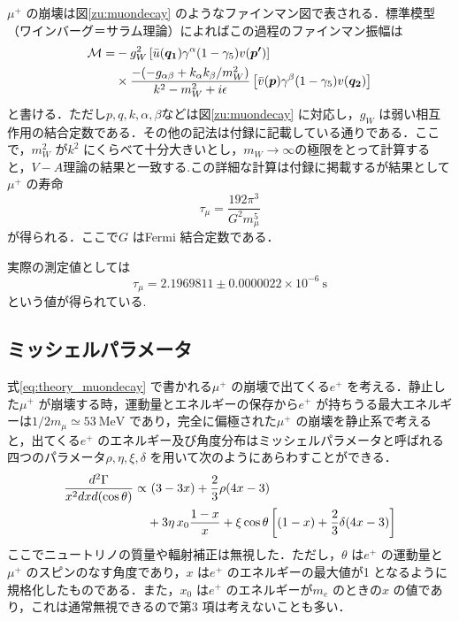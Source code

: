 $\mu^{+}$ の崩壊は図\ref{zu:muondecay} のようなファインマン図で表される．標準模型（ワインバーグ＝サラム理論）によればこの過程のファインマン振幅は
\begin{align}
\mathcal{M} = &-g_{W}^2\left[\Bar{u}(\bm{q_{1}})\gamma^{\alpha}(1 - \gamma_{5})v(\bm{p'})\right] \notag \\ 
&\times \frac{-(-g_{\alpha\beta} + k_{\alpha}k_{\beta}/m_{W}^2)}{k^{2} - m_{W}^2 + i\epsilon}\left[\Bar{v}(\bm{p})\gamma^{\beta}(1 - \gamma_5)v(\bm{q_{2}})\right]
\label{eq:theory_muondecayamp}
\end{align}%
と書ける．ただし$p, q, k, \alpha, \beta$などは図\ref{zu:muondecay} に対応し，$g_{W}$ は弱い相互作用の結合定数である．その他の記法は付録に記載している通りである．ここで，$m_{W}^2$ が$k^2$ にくらべて十分大きいとし，$m_{W} \rightarrow \infty$の極限をとって計算すると，$V-A$理論の結果と一致する.この詳細な計算は付録に掲載するが結果として$\mu^+$ の寿命
\begin{equation}
\tau_{\mu} = \frac{192\pi^3}{G^{2} m_{\mu}^{5}}
\label{eq:thory_muonlifetime}
\end{equation}
が得られる．ここで$G$ はFermi 結合定数である．

実際の測定値としては
\[\tau_{\mu} = 2.1969811 \pm 0.0000022 \times 10^{-6}~\mathrm{s}\]
という値が得られている\cite{PDG}.
	
\subsection{ミッシェルパラメータ}
式\eqref{eq:theory_muondecay} で書かれる$\mu^{+}$ の崩壊で出てくる$e^{+}$ を考える．静止した$\mu^{+}$ が崩壊する時，運動量とエネルギーの保存から$e^{+}$ が持ちうる最大エネルギーは$1/2 m_{\mu} \simeq 53~\mathrm{MeV}$ であり，完全に偏極された$\mu^{+}$ の崩壊を静止系で考えると，出てくる$e^{+}$ のエネルギー及び角度分布はミッシェルパラメータと呼ばれる四つのパラメータ$\rho, \eta, \xi, \delta$ を用いて次のようにあらわすことができる\cite{michel_parameter}．
\begin{align}
\frac{d^2\Gamma}{x^{2}dxd(\cos \theta)} \propto& \,\,(3 - 3x) + \frac{2}{3}\rho (4x - 3) \notag \\
&+ 3 \eta \,x_{0} \frac{1-x}{x} + \xi \cos \theta \left[(1 - x) + \frac{2}{3} \delta (4x - 3)\right]
\label{eq:theory_michel}
\end{align}
ここでニュートリノの質量や輻射補正は無視した．ただし，$\theta$ は$e^{+}$ の運動量と$\mu^{+}$ のスピンのなす角度であり，$x$ は$e^{+}$ のエネルギーの最大値が1 となるように規格化したものである．また，$x_0$ は$e^{+}$ のエネルギーが$m_{e}$ のときの$x$ の値であり，これは通常無視できるので第3 項は考えないことも多い．

